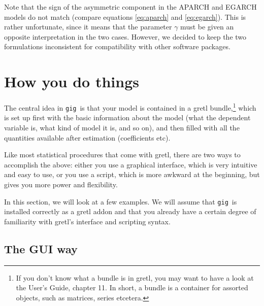 \documentclass[a4paper,11pt]{article}
\newcommand{\app}[1]{\textsf{#1}}
\newcounter{script}[section]
\newcommand{\uhat}{\ensuremath u}
\newcommand{\gig}{\texttt{gig}}
\begin{document}
Note that the sign of the asymmetric component in the APARCH and
EGARCH models do not match (compare equations \eqref{eq:aparch} and
\eqref{eq:egarch}). This is rather unfortunate, since it means that
the parameter $\gamma$ must be given an opposite interpretation in the
two cases. However, we decided to keep the two formulations
inconsistent for compatibility with other software packages.




\section{How you do things}

The central idea in \gig\ is that your model is contained in a
\app{gretl} bundle,\footnote{If you don't know what a bundle is in
  \app{gretl}, you may want to have a look at the User's Guide,
  chapter 11. In short, a bundle is a container for assorted objects,
  such as matrices, series etcetera.} which is set up first with the
basic information about the model (what the dependent variable is,
what kind of model it is, and so on), and then filled with all the
quantities available after estimation (coefficients etc).

Like most statistical procedures that come with \app{gretl}, there are
two ways to accomplish the above: either you use a graphical
interface, which is very intuitive and easy to use, or you use a
script, which is more awkward at the beginning, but gives you more
power and flexibility.

In this section, we will look at a few examples. We will assume that
\gig\ is installed correctly as a \app{gretl} addon and that you
already have a certain degree of familiarity with \app{gretl}'s
interface and scripting syntax.


\subsection{The GUI way}
\label{sec:GUI}
\end{document}
